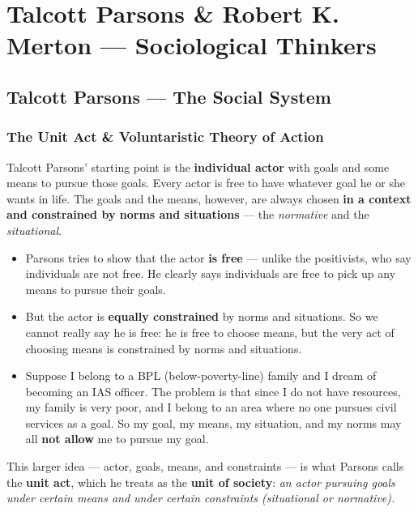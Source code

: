 \chapter{Talcott Parsons \& Robert K. Merton --- Sociological Thinkers}


\section{Talcott Parsons --- The Social System}

\subsection{The Unit Act \& Voluntaristic Theory of Action}

Talcott Parsons' starting point is the \textbf{individual actor} with goals and some means to pursue those goals. Every actor is free to have whatever goal he or she wants in life. The goals and the means, however, are always chosen \textbf{in a context and constrained by norms and situations} --- the \textit{normative} and the \textit{situational}.

\begin{KeyConcept}
\begin{itemize}
\item Parsons tries to show that the actor \textbf{is free} --- unlike the positivists, who say individuals are not free. He clearly says individuals are free to pick up any means to pursue their goals.
\item But the actor is \textbf{equally constrained} by norms and situations. So we cannot really say he is free: he is free to choose means, but the very act of choosing means is constrained by norms and situations.
\end{itemize}
\end{KeyConcept}

\begin{ExampleBox}
\begin{itemize}
\item Suppose I belong to a BPL (below-poverty-line) family and I dream of becoming an IAS officer. The problem is that since I do not have resources, my family is very poor, and I belong to an area where no one pursues civil services as a goal. So my goal, my means, my situation, and my norms may all \textbf{not allow} me to pursue my goal.
\end{itemize}
\end{ExampleBox}

This larger idea --- actor, goals, means, and constraints --- is what Parsons calls the \textbf{unit act}, which he treats as the \textbf{unit of society}: \textit{an actor pursuing goals under certain means and under certain constraints (situational or normative).}

